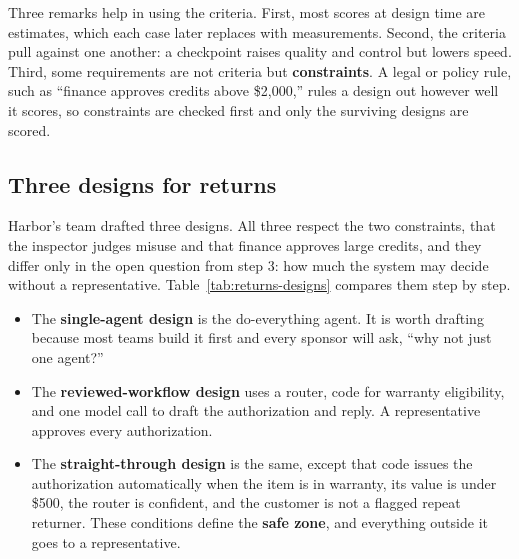 Three remarks help in using the criteria. First, most scores at design time are estimates, which each case later replaces with measurements. Second, the criteria pull against one another: a checkpoint raises quality and control but lowers speed. Third, some requirements are not criteria but \textbf{constraints}. A legal or policy rule, such as ``finance approves credits above \$2{,}000,'' rules a design out however well it scores, so constraints are checked first and only the surviving designs are scored.

\subsection{Three designs for returns}
\label{sec:tradeoff}

Harbor's team drafted three designs. All three respect the two constraints, that the inspector judges misuse and that finance approves large credits, and they differ only in the open question from step 3: how much the system may decide without a representative. Table~\ref{tab:returns-designs} compares them step by step.
\begin{itemize}[itemsep=2pt]
  \item The \textbf{single-agent design} is the do-everything agent. It is worth drafting because most teams build it first and every sponsor will ask, ``why not just one agent?''
  \item The \textbf{reviewed-workflow design} uses a router, code for warranty eligibility, and one model call to draft the authorization and reply. A representative approves every authorization.
  \item The \textbf{straight-through design} is the same, except that code issues the authorization automatically when the item is in warranty, its value is under \$500, the router is confident, and the customer is not a flagged repeat returner. These conditions define the \textbf{safe zone}, and everything outside it goes to a representative.
\end{itemize}

